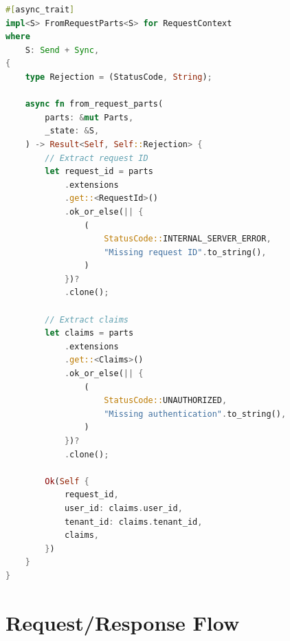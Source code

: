 \documentclass[12pt,a4paper,twoside]{report}
\begin{document}
\begin{lstlisting}[language=Rust,caption={Authentication Middleware - crates/gaussmeridian-api/src/middleware/auth.rs}]
#[async_trait]
impl<S> FromRequestParts<S> for RequestContext
where
    S: Send + Sync,
{
    type Rejection = (StatusCode, String);
    
    async fn from_request_parts(
        parts: &mut Parts,
        _state: &S,
    ) -> Result<Self, Self::Rejection> {
        // Extract request ID
        let request_id = parts
            .extensions
            .get::<RequestId>()
            .ok_or_else(|| {
                (
                    StatusCode::INTERNAL_SERVER_ERROR,
                    "Missing request ID".to_string(),
                )
            })?
            .clone();
        
        // Extract claims
        let claims = parts
            .extensions
            .get::<Claims>()
            .ok_or_else(|| {
                (
                    StatusCode::UNAUTHORIZED,
                    "Missing authentication".to_string(),
                )
            })?
            .clone();
        
        Ok(Self {
            request_id,
            user_id: claims.user_id,
            tenant_id: claims.tenant_id,
            claims,
        })
    }
}
\end{lstlisting}

\section{Request/Response Flow}
\end{document}
